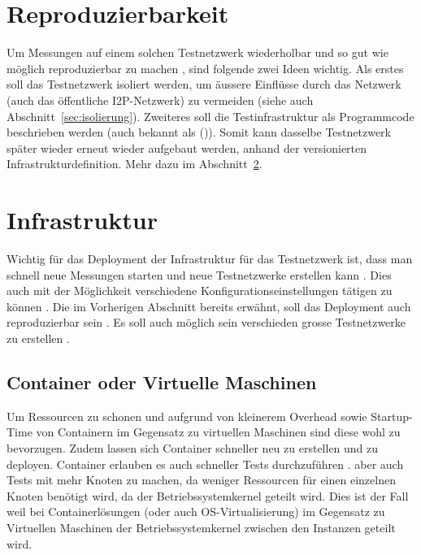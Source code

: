 
\section{Reproduzierbarkeit}

Um Messungen auf einem solchen Testnetzwerk wiederholbar und so gut wie möglich reproduzierbar zu machen , sind folgende zwei Ideen wichtig.
Als erstes soll das Testnetzwerk isoliert werden, um äussere Einflüsse durch das Netzwerk (auch das öffentliche I2P-Netzwerk) zu vermeiden (siehe auch Abschnitt~\ref{sec:isolierung}).
Zweiteres soll die Testinfrastruktur als Programmcode beschrieben werden (auch bekannt als  ()).
Somit kann dasselbe Testnetzwerk später wieder erneut wieder aufgebaut werden, anhand der versionierten Infrastrukturdefinition.
Mehr dazu im Abschnitt~\ref{sec:infrastructure}.

\section{Infrastruktur}\label{sec:infrastructure}

Wichtig für das Deployment der Infrastruktur für das Testnetzwerk ist, dass man schnell neue Messungen starten und neue Testnetzwerke erstellen kann .
Dies auch mit der Möglichkeit verschiedene Konfigurationseinstellungen tätigen zu können .
Die im Vorherigen Abschnitt bereits erwähnt, soll das Deployment auch reproduzierbar sein .
Es soll auch möglich sein verschieden grosse Testnetzwerke zu erstellen .

\subsection{Container oder Virtuelle Maschinen}

Um Ressourcen zu schonen und aufgrund von kleinerem Overhead sowie Startup-Time von Containern im Gegensatz zu virtuellen Maschinen sind diese wohl zu bevorzugen.
Zudem lassen sich Container schneller neu zu erstellen und zu deployen.
Container erlauben es auch schneller Tests durchzuführen . 
aber auch Tests mit mehr Knoten zu machen, da weniger Ressourcen für einen einzelnen Knoten benötigt wird, da der Betriebssystemkernel geteilt wird.
Dies ist der Fall weil bei Containerlösungen (oder auch OS-Virtualisierung) im Gegensatz zu Virtuellen Maschinen der Betriebssystemkernel zwischen den Instanzen geteilt wird.

